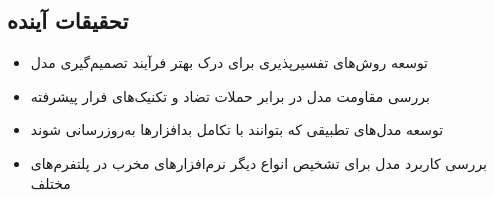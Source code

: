 \documentclass[a4paper,oneside,12pt]{report}
\theoremstyle{definition}
\begin{document}
\subsection{تحقیقات آینده}
\begin{itemize}
    \item توسعه روش‌های تفسیرپذیری برای درک بهتر فرآیند تصمیم‌گیری مدل
    \item بررسی مقاومت مدل در برابر حملات تضاد و تکنیک‌های فرار پیشرفته
    \item توسعه مدل‌های تطبیقی که بتوانند با تکامل بدافزارها به‌روزرسانی شوند
    \item بررسی کاربرد مدل برای تشخیص انواع دیگر نرم‌افزارهای مخرب در پلتفرم‌های مختلف
\end{itemize}

\newpage
\begin{latin}
  \printbibliography[heading=bibintoc,title={مراجع}]
\end{latin}
\end{document}
